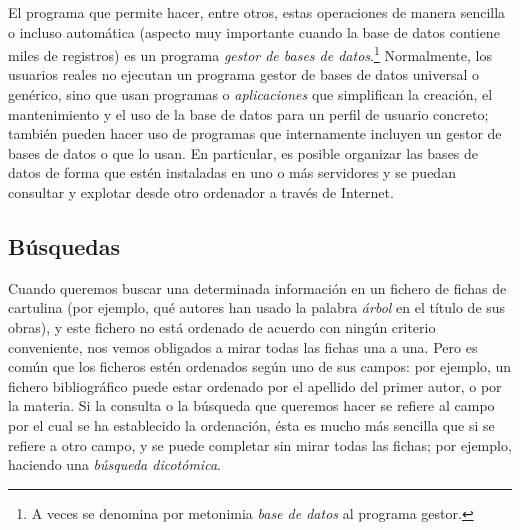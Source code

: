 \begin{itemize}
\end{itemize} El programa que permite hacer, entre otros, estas operaciones de manera sencilla o incluso automática (aspecto muy importante cuando la base de datos contiene miles de registros) es un programa \emph{gestor de bases de datos}.\footnote{A veces se denomina por metonimia \emph{base de datos} al programa gestor.} Normalmente, los usuarios reales no ejecutan un programa gestor de bases de datos universal o genérico, sino que usan programas o \emph{aplicaciones} que simplifican la creación, el mantenimiento y el uso de la base de datos para un perfil de usuario concreto; también pueden hacer uso de programas que internamente incluyen un gestor de bases de datos o que lo usan. En particular, es posible organizar las bases de datos de forma que estén instaladas en uno o más servidores y se puedan consultar y explotar desde otro ordenador a través de Internet. 

\subsection{Búsquedas} 

Cuando queremos buscar una determinada información en un fichero de fichas de cartulina (por ejemplo, qué autores han usado la palabra \emph{árbol} en el título de sus obras), y este fichero no está ordenado de acuerdo con ningún criterio conveniente, nos vemos obligados a mirar todas las fichas una a una. Pero es común que los ficheros estén ordenados según uno de sus campos: por ejemplo, un fichero bibliográfico puede estar ordenado por el apellido del primer autor, o por la materia. Si la consulta o la búsqueda que queremos hacer se refiere al campo por el cual se ha establecido la ordenación, ésta es mucho más sencilla que si se refiere a otro campo, y se puede completar sin mirar todas las fichas; por ejemplo, haciendo una \emph{búsqueda dicotómica}. 

